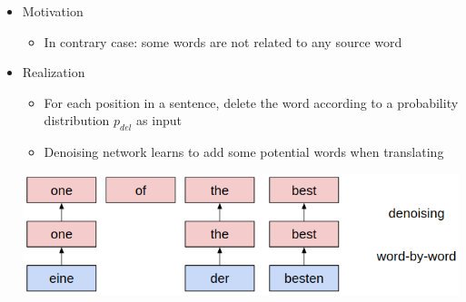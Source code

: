 \documentclass[11pt, a4paper, landscape]{article}
\begin{document}
\vfill

\NewPage
{}
\begin{itemize}
	\item Motivation
	\begin{itemize}
		\item In contrary case: some words are not related to any source word
	\end{itemize}
	
	\item Realization
	\begin{itemize}
		\item For each position in a sentence, delete the word according to a probability distribution ${p_{del}}$ as input
		\item  Denoising network learns to add some potential words when translating
	\end{itemize}	
	\begin{center}
		\vspace{0.5em}
		\hspace{-1cm}\includegraphics[width=0.8\linewidth]{deletion}
	\end{center}\vspace{0.5em}	
\end{itemize}
\end{document}
